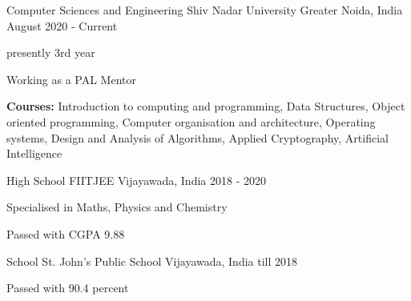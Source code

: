

\begin{cventries}

  \cventry
    {Computer Sciences and Engineering} %
    {Shiv Nadar University} %
    {Greater Noida, India} %
    {August 2020 - Current} %
    {
      \begin{cvitems} %
        \item {presently 3rd year}
        \item {Working as a PAL Mentor}
        \item {\textbf{Courses:} Introduction to computing and programming, Data Structures, Object oriented programming, Computer organisation and architecture, Operating systems, Design and Analysis of Algorithms, Applied Cryptography, Artificial Intelligence}
      \end{cvitems}
    }
    
  \cventry
    {High School} %
    {FIITJEE} %
    {Vijayawada, India} %
    {2018 - 2020} %
    {
      \begin{cvitems} %
        \item {Specialised in Maths, Physics and Chemistry}
        \item {Passed with CGPA 9.88}
      \end{cvitems}
    }
    
  \cventry
    {School} %
    {St. John's Public School} %
    {Vijayawada, India} %
    {till 2018} %
    {
      \begin{cvitems} %
        \item {Passed with 90.4 percent}
      \end{cvitems}
    }
\end{cventries}
